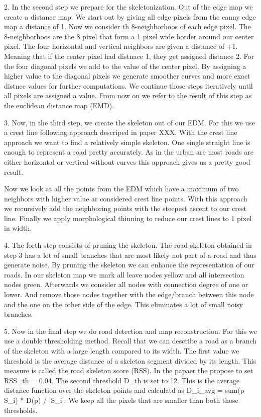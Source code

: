 \documentclass[10pt,conference,compsocconf]{IEEEtran}
\begin{document}
2. In the second step we prepare for the skeletonization. Out of the edge map we create a distance map. 
We start out by giving all edge pixels from the canny edge map a distance of 1. Now we consider th 8-neighborhoos of each edge pixel. The 8-neighborhoos are the 8 pixel that form a 1 pixel wide border around our center pixel. The four horizontal and vertical neighbors are given a distance of +1. Meaning that if the center pixel had distnace 1, they get assigned distance 2. For the four diagonal pixels we add  to the value of the center pixel. By assigning a higher value to the diagonal pixels we generate smoother curves and more exact distnce values for further computations. We continue those steps iteratively until all pixels are assigned a value. From now on we refer to the result of this step as the euclidean distance map (EMD).

3. Now, in the third step, we create the skeleton out of our EDM. For this we use a crest line following approach descriped in paper XXX. With the crest line approach we want to find a relatively simple skeleton. One single straight line is enough to represent a road pretty accurately. As in the urban are most roads are either horizontal or vertical without curves this approach gives us a pretty good result. 

Now we look at all the points from the EDM which have a maximum of two neighbors with higher value ar considered crest line points. With this approach we recursively add the neighboring points with the steepest ascent to our crest line. Finally we apply morphological thinning to reduce our crest lines to 1 pixel in width.

4. The forth step consists of pruning the skeleton. The road skeleton obtained in step 3 has a lot of small branches that are most likely not part of a road and thus generate noise. By pruning the skeleton we can enhance the representation of our roads. In our skeleton map we mark all leave nodes yellow and all intersection nodes green. Afterwards we consider all nodes with connection degree of one or lower. And remove those nodes together with the edge/branch between this node and the one on the other side of the edge. This eliminates a lot of small noisy branches. 


5. Now in the final step we do road detection and map reconstruction. For this we use a double thresholding method. Recall that we can describe a road as a branch of the skeleton with a large length compared to its width. The first value we threshold is the average distance of a skeleton segment divided by its length. This measure is called the road skeleton score (RSS). In the papaer the propose to set RSS_th = 0.04. The second threshold D_th is set to 12. This is the average distance function over the skeleton points and calculatd as D_i_avg = sum(p \in S_i) * D(p) / |S_i|. We keep all the pixels that are smaller than both those thresholds. 
\end{document}
